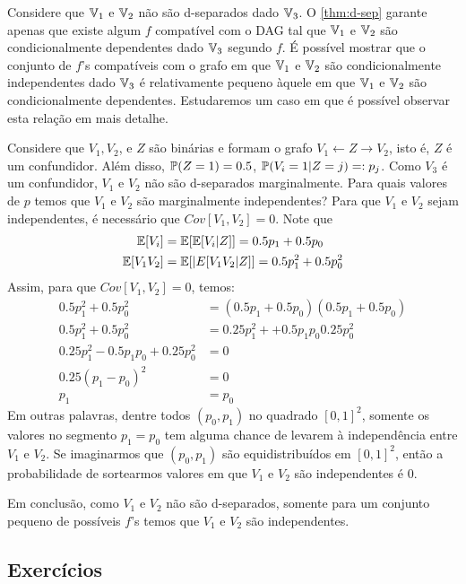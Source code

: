 \begin{example}
 Considere que $\V_1$ e $\V_2$ 
 não são d-separados dado $\V_3$.
 O \cref{thm:d-sep} garante apenas que existe
 algum $f$ compatível com o DAG tal que
 $\V_1$ e $\V_2$ são 
 condicionalmente dependentes dado $\V_3$
 segundo $f$.
 É possível mostrar que
 o conjunto de $f$'s compatíveis com o grafo
 em que $\V_1$ e $\V_2$ são 
 condicionalmente independentes dado $\V_3$ é
 relativamente pequeno àquele em que
 $\V_1$ e $\V_2$ são condicionalmente dependentes.
 Estudaremos um caso em que
 é possível observar esta relação em mais detalhe.
 
 Considere que $V_1, V_2$, e $Z$ são binárias e
 formam o grafo $V_1 \leftarrow Z \rightarrow V_2$,
 isto é, $Z$ é um confundidor.
 Além disso, $\P(Z = 1) = 0.5$,
 $\P(V_i = 1|Z = j) =: p_j$.
 Como $V_3$ é um confundidor,
 $V_1$ e $V_2$ não são d-separados marginalmente.
 Para quais valores de $p$ temos que 
 $V_1$ e $V_2$ são marginalmente independentes?
 Para que $V_1$ e $V_2$ sejam independentes,
 é necessário que $Cov[V_1,V_2] = 0$.
 Note que
 \begin{align*}
  \E[V_i] 
  &= \E[\E[V_i|Z]]
  = 0.5 p_1 + 0.5 p_0 \\
  \E[V_1 V_2]
  &= \E[|E[V_1 V_2|Z]]
  = 0.5 p_1^2 + 0.5 p_0^2
 \end{align*}
 Assim, para que $Cov[V_1,V_2] = 0$, temos:
 \begin{align*}
  0.5 p^2_1 + 0.5 p^2_0
  &= (0.5 p_1 + 0.5 p_0)(0.5 p_1 + 0.5 p_0) \\
  0.5 p^2_1 + 0.5 p^2_0
  &= 0.25 p_1^2 + +0.5p_1p_0 0.25 p_0^2 \\
  0.25 p^2_1 - 0.5 p_1 p_0 + 0.25 p^2_0 &= 0 \\
  0.25(p_1 - p_0)^2 &= 0 \\
  p_1 &= p_0
 \end{align*}
 Em outras palavras, dentre todos $(p_0,p_1)$
 no quadrado $[0,1]^2$, 
 somente os valores no segmento $p_1 = p_0$
 tem alguma chance de levarem à 
 independência entre $V_1$ e $V_2$.
 Se imaginarmos que $(p_0,p_1)$ são
 equidistribuídos em $[0,1]^2$, então
 a probabilidade de sortearmos valores em que
 $V_1$ e $V_2$ são independentes é 0.
 
 Em conclusão, como $V_1$ e $V_2$ não são d-separados,
 somente para um conjunto pequeno de possíveis $f$'s
 temos que $V_1$ e $V_2$ são independentes.
\end{example}

\subsection{Exercícios}


